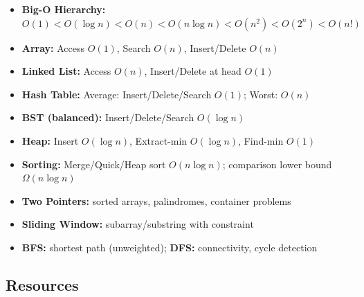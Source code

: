 \documentclass[11pt, a4paper, oneside]{report}
\begin{document}
\begin{cheatsheetbox}
\begin{itemize}[leftmargin=*]
\item \textbf{Big-O Hierarchy:} $O(1) < O(\log n) < O(n) < O(n \log n) < O(n^2) < O(2^n) < O(n!)$
\item \textbf{Array:} Access $O(1)$, Search $O(n)$, Insert/Delete $O(n)$
\item \textbf{Linked List:} Access $O(n)$, Insert/Delete at head $O(1)$
\item \textbf{Hash Table:} Average: Insert/Delete/Search $O(1)$; Worst: $O(n)$
\item \textbf{BST (balanced):} Insert/Delete/Search $O(\log n)$
\item \textbf{Heap:} Insert $O(\log n)$, Extract-min $O(\log n)$, Find-min $O(1)$
\item \textbf{Sorting:} Merge/Quick/Heap sort $O(n \log n)$; comparison lower bound $\Omega(n \log n)$
\item \textbf{Two Pointers:} sorted arrays, palindromes, container problems
\item \textbf{Sliding Window:} subarray/substring with constraint
\item \textbf{BFS:} shortest path (unweighted); \textbf{DFS:} connectivity, cycle detection
\end{itemize}
\end{cheatsheetbox}


\subsection*{Resources}
\end{document}
